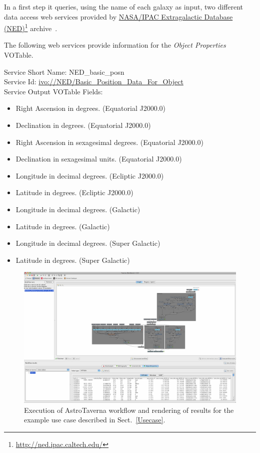 \documentclass[final,authoryear,5p,times,twocolumn]{elsarticle}
\newcommand{\urlsamefont}[1]{\urlstyle{same}\url{#1}}
\newcommand{\hrefnote}[2]{\href{#1}{#2}\footnote{\urlsamefont{#1}}}
\begin{document}
In a first step it queries, using the name of each galaxy as input, two different data access web services provided by \hrefnote{http://ned.ipac.caltech.edu/}{NASA/IPAC Extragalactic Database (NED)} archive~\citep{Mazzarella2008}.

The following web services provide information for the \textit{Object Properties} VOTable.

\begin{minipage}[h]{0.99\columnwidth}
  \small \vspace{\baselineskip}
  \noindent Service Short Name: NED\_basic\_posn\\
  Service Id: \url{ivo://NED/Basic\_Position\_Data\_For\_Object}\\
  Service Output VOTable Fields:
  \begin{itemize}
	  \item Right Ascension in degrees. (Equatorial J2000.0)
	  \item Declination in degrees. (Equatorial J2000.0)
	  \item Right Ascension in sexagesimal degrees. (Equatorial J2000.0)
	  \item Declination in sexagesimal units. (Equatorial J2000.0)
	  \item Longitude in decimal degrees. (Ecliptic J2000.0)
	  \item Latitude in degrees. (Ecliptic J2000.0)
	  \item Longitude in decimal degrees. (Galactic)
	  \item Latitude in degrees. (Galactic)
	  \item Longitude in decimal degrees. (Super Galactic)
	  \item Latitude in degrees. (Super Galactic)
  \end{itemize}
\end{minipage}

\begin{figure}
\centering 
\includegraphics[width=0.99\columnwidth]{WfExec.pdf}
\caption{
Execution of AstroTaverna workflow and rendering of results for the example use case described in Sect.~\ref{Usecase}.
}
\label{fig:WfExec}
\end{figure}
\end{document}
